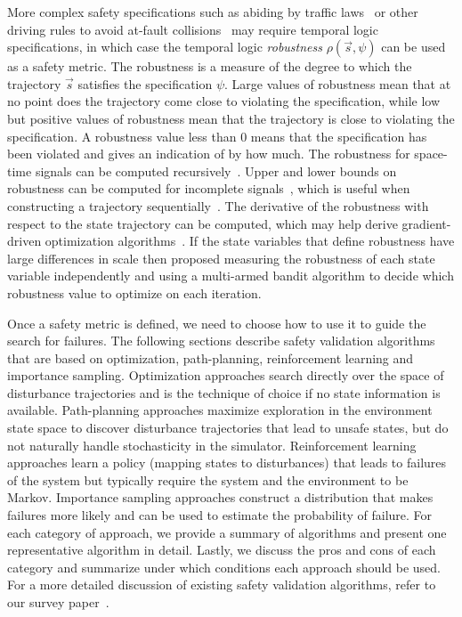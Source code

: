 More complex safety specifications such as abiding by traffic laws~\cite{kress2008automatically, qin2019automatic} or other driving rules to avoid at-fault collisions~\cite{shalev2017formal,hekmatnejad2019encoding,hekmatnejad2020search} may require temporal logic specifications, in which case the temporal logic \emph{robustness} $\rho(\vec{s}, \psi)$ can be used as a safety metric. The robustness is a measure of the degree to which the trajectory $\vec{s}$ satisfies the specification $\psi$. Large values of robustness mean that at no point does the trajectory come close to violating the specification, while low but positive values of robustness mean that the trajectory is close to violating the specification. A robustness value less than \num{0} means that the specification has been violated and gives an indication of by how much. The robustness for space-time signals can be computed recursively~\cite{fainekos2009robustness, Donze2010robust,fainekos2009robustness,yang2013dynamic}. Upper and lower bounds on robustness can be computed for incomplete signals~\cite{dreossi2015efficient}, which is useful when constructing a trajectory sequentially~\cite{dreossi2015efficient,ernst2019fast}. The derivative of the robustness with respect to the state trajectory can be computed, which may help derive gradient-driven optimization algorithms~\cite{pant2017smooth, leung2019backpropagation}. If the state variables that define robustness have large differences in scale then \textcite{zhang2019multi} proposed measuring the robustness of each state variable independently and using a multi-armed bandit algorithm to decide which robustness value to optimize on each iteration.

Once a safety metric is defined, we need to choose how to use it to guide the search for failures. The following sections describe safety validation algorithms that are based on optimization, path-planning, reinforcement learning and importance sampling. Optimization approaches search directly over the space of disturbance trajectories and is the technique of choice if no state information is available. Path-planning approaches maximize exploration in the environment state space to discover disturbance trajectories that lead to unsafe states, but do not naturally handle stochasticity in the simulator. Reinforcement learning approaches learn a policy (mapping states to disturbances) that leads to failures of the system but typically require the system and the environment to be Markov. Importance sampling approaches construct a distribution that makes failures more likely and can be used to estimate the probability of failure. For each category of approach, we provide a summary of algorithms and present one representative algorithm in detail. Lastly, we discuss the pros and cons of each category and summarize under which conditions each approach should be used. For a more detailed discussion of existing safety validation algorithms, refer to our survey paper~\cite{corso2020survey}.

